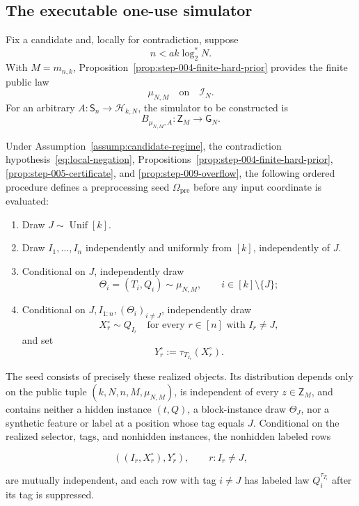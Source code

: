 \subsection{The executable one-use simulator}\label{app:step-010}
Fix a candidate and, locally for contradiction, suppose
\begin{equation}
n<ak\log_2^*N.
\tag{2}\label{eq:local-negation}
\end{equation}
With $M=m_{n,k}$, Proposition~\ref{prop:step-004-finite-hard-prior}
provides the finite public law
\begin{equation}
\mu_{N,M}\quad\text{on}\quad\mathcal I_N.
\tag{3}\label{eq:public-prior}
\end{equation}
For an arbitrary $A:\mathsf S_n\to\mathcal H_{k,N}$, the simulator to be
constructed is
\begin{equation}
B_{\mu_{N,M},A}:\mathsf Z_M\longrightarrow\mathsf G_N.
\tag{5}\label{eq:simulator-type}
\end{equation}
\begin{lemma}\label{lem:step-010-public-preprocessing}
Under Assumption~\ref{assump:candidate-regime}, the contradiction hypothesis~\eqref{eq:local-negation},
Propositions~\ref{prop:step-004-finite-hard-prior},
\ref{prop:step-005-certificate}, and
\ref{prop:step-009-overflow}, the following ordered procedure defines a
preprocessing seed \(\Omega_{\mathrm{pre}}\) before any input coordinate is
evaluated:

\begin{enumerate}
\item Draw \(J\sim\operatorname{Unif}[k]\).
\item Draw \(I_1,\ldots,I_n\) independently and uniformly from \([k]\),
independently of \(J\).
\item Conditional on \(J\), independently draw
   \[
     \Theta_i=(T_i,Q_i)\sim\mu_{N,M},
     \qquad i\in[k]\setminus\{J\};
   \]
\item Conditional on \(J,I_{1:n},(\Theta_i)_{i\ne J}\), independently draw
   \[
     X_r^\circ\sim Q_{I_r}
     \quad\text{for every }r\in[n]\text{ with }I_r\ne J,
   \]
   and set
   \[
     Y_r^\circ:=\tau_{T_{I_r}}(X_r^\circ).
   \]
\end{enumerate}

The seed consists of precisely these realized objects. Its distribution
depends only on the public tuple
\((k,N,n,M,\mu_{N,M})\), is independent of every
\(z\in\mathsf Z_M\), and contains neither a hidden instance
\((t,Q)\), a block-instance draw \(\Theta_J\), nor a synthetic feature or
label at a position whose tag equals \(J\). Conditional on the realized
selector, tags, and nonhidden instances, the nonhidden labeled
rows

\[
  \left((I_r,X_r^\circ),Y_r^\circ\right),
  \qquad r:I_r\ne J,
\tag{6}
\]

are mutually independent, and each row with tag \(i\ne J\) has labeled law
\(Q_i^{\tau_{T_i}}\) after its tag is suppressed.
\end{lemma}

